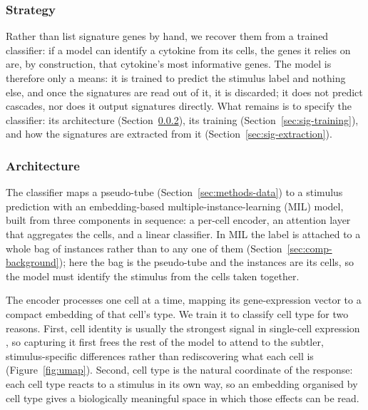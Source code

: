 \documentclass[11pt,a4paper]{article}
\begin{document}
\subsubsection{Strategy}
\label{sec:sig-strategy}
Rather than list signature genes by hand, we recover them from a trained classifier: if a model can identify a cytokine from its cells, the genes it relies on are, by construction, that cytokine's most informative genes.
The model is therefore only a means: it is trained to predict the stimulus label and nothing else, and once the signatures are read out of it, it is discarded; it does not predict cascades, nor does it output signatures directly.
What remains is to specify the classifier: its architecture (Section~\ref{sec:sig-architecture}), its training (Section~\ref{sec:sig-training}), and how the signatures are extracted from it (Section~\ref{sec:sig-extraction}).

\subsubsection{Architecture}
\label{sec:sig-architecture}
The classifier maps a pseudo-tube (Section~\ref{sec:methods-data}) to a stimulus prediction with an embedding-based multiple-instance-learning (MIL) model, built from three components in sequence: a per-cell encoder, an attention layer that aggregates the cells, and a linear classifier. In MIL the label is attached to a whole bag of instances rather than to any one of them (Section~\ref{sec:comp-background}); here the bag is the pseudo-tube and the instances are its cells, so the model must identify the stimulus from the cells taken together.

The encoder processes one cell at a time, mapping its gene-expression vector to a compact embedding of that cell's type. We train it to classify cell type for two reasons. First, cell identity is usually the strongest signal in single-cell expression \citep{kang2018multiplexed,luecken2019current,srivatsan2020massively}, so capturing it first frees the rest of the model to attend to the subtler, stimulus-specific differences rather than rediscovering what each cell is (Figure~\ref{fig:umap}). Second, cell type is the natural coordinate of the response: each cell type reacts to a stimulus in its own way, so an embedding organised by cell type gives a biologically meaningful space in which those effects can be read.
\end{document}
